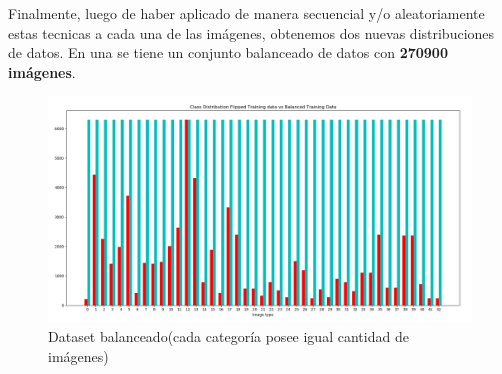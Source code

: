 	
	Finalmente, luego de haber aplicado de manera secuencial y/o aleatoriamente estas tecnicas a cada una de las imágenes, obtenemos dos nuevas distribuciones de datos. 
	\newline
	En una se tiene un conjunto balanceado de datos con {\bf 270900 imágenes}.
	\begin{figure}[H]
		\includegraphics[width=1\textwidth]{images/desarrollo/histograms/train_extended_balanced270900}
		\begin{center}
		\caption{\small{Dataset balanceado(cada categoría posee igual cantidad de imágenes)}}
		\vspace{-1em}
		{\small{\fontsize{10}{16.8}\selectfont {Fuente propia}}}
		\end{center}
		\vspace{-1.5em}
	\end{figure}

